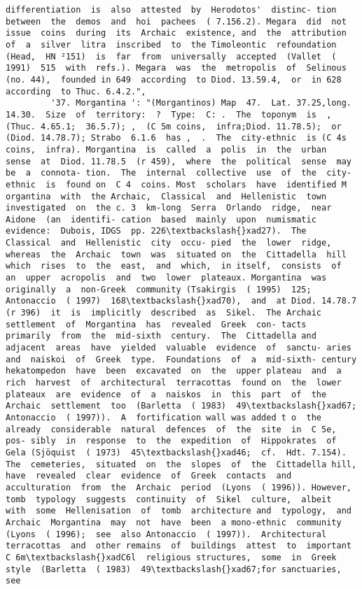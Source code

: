\documentclass[11pt]{article}
\begin{document}
\begin{Verbatim}[commandchars=\\\{\}]
differentiation  is  also  attested  by  Herodotos'  distinc- tion  between  the  demos  and  hoi  pachees  ( 7.156.2). Megara  did  not  issue  coins  during  its  Archaic  existence, and  the  attribution  of  a  silver  litra  inscribed  to  the Timoleontic  refoundation  (Head,  HN ²151)  is  far  from  universally  accepted  (Vallet  ( 1991)  515  with  refs.). Megara  was  the  metropolis  of  Selinous  (no. 44),  founded in 649  according  to Diod. 13.59.4,  or  in 628  according  to Thuc. 6.4.2.",
         '37. Morgantina ': "(Morgantinos) Map  47.  Lat. 37.25,long. 14.30.  Size  of  territory:  ?  Type:  C: .  The  toponym  is  ,  (Thuc. 4.65.1;  36.5.7); ,  (C 5m coins,  infra;Diod. 11.78.5);  or   (Diod. 14.78.7); Strabo  6.1.6  has ,  .  The  city-ethnic  is (C 4s  coins,  infra). Morgantina  is  called  a  polis  in  the  urban  sense  at  Diod. 11.78.5  (r 459),  where  the  political  sense  may  be  a  connota- tion.  The  internal  collective  use  of  the  city-ethnic  is  found on  C 4  coins. Most  scholars  have  identified M organtina  with  the Archaic,  Classical  and  Hellenistic  town  investigated  on  the c. 3  km-long  Serra  Orlando  ridge,  near  Aidone  (an  identifi- cation  based  mainly  upon  numismatic  evidence:  Dubois, IDGS  pp. 226\textbackslash{}xad27).  The  Classical  and  Hellenistic  city  occu- pied  the  lower  ridge,  whereas  the  Archaic  town  was  situated on  the  Cittadella  hill  which  rises  to  the  east,  and  which,  in itself,  consists  of  an  upper  acropolis  and  two  lower  plateaux. Morgantina  was  originally  a  non-Greek  community (Tsakirgis  ( 1995)  125;  Antonaccio  ( 1997)  168\textbackslash{}xad70),  and  at Diod. 14.78.7  (r 396)  it  is  implicitly  described  as  Sikel.  The Archaic  settlement  of  Morgantina  has  revealed  Greek  con- tacts  primarily  from  the  mid-sixth  century.  The  Cittadella and  adjacent  areas  have  yielded  valuable  evidence  of  sanctu- aries  and  naiskoi  of  Greek  type.  Foundations  of  a  mid-sixth- century  hekatompedon  have  been  excavated  on  the  upper plateau  and  a  rich  harvest  of  architectural  terracottas  found on  the  lower  plateaux  are  evidence  of  a  naiskos  in  this  part  of  the  Archaic  settlement  too  (Barletta  ( 1983)  49\textbackslash{}xad67; Antonaccio  ( 1997)).  A  fortification wall was added t o  the already  considerable  natural  defences  of  the  site  in  C 5e,  pos- sibly  in  response  to  the  expedition  of  Hippokrates  of  Gela (Sjöquist  ( 1973)  45\textbackslash{}xad46;  cf.  Hdt. 7.154). The  cemeteries,  situated  on  the  slopes  of  the  Cittadella hill,  have  revealed  clear  evidence  of  Greek  contacts  and acculturation  from  the  Archaic  period  (Lyons  ( 1996)). However,  tomb  typology  suggests  continuity  of  Sikel  culture,  albeit  with  some  Hellenisation  of  tomb  architecture and  typology,  and  Archaic  Morgantina  may  not  have  been  a mono-ethnic  community  (Lyons  ( 1996);  see  also Antonaccio  ( 1997)).  Architectural  terracottas  and  other remains  of  buildings  attest  to  important  C 6m\textbackslash{}xadC6l  religious structures,  some  in  Greek  style  (Barletta  ( 1983)  49\textbackslash{}xad67;for sanctuaries,  see  
\end{Verbatim}
\end{document}
